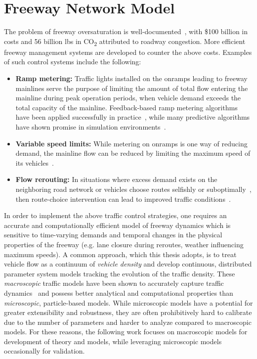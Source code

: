 \chapter{Freeway Network Model}
\label{chapter:freeway-network-model}

The problem of freeway oversaturation is well-documented~\cite{schrank2012tti}, with \$100 billion in costs and 56 billion lbs in CO\textsubscript{2} attributed to roadway congestion. More efficient freeway management systems are developed to counter the above costs. Examples of such control systems include the following:

\begin{itemize}
  	\item \textbf{Ramp metering: } Traffic lights installed on the onramps leading to freeway mainlines serve the purpose of limiting the amount of total flow entering the mainline during peak operation periods, when vehicle demand exceeds the total capacity of the mainline. Feedback-based ramp metering algorithms have been applied successfully in practice~\cite{papageorgiou1997alinea,Papageorgiou1991,Papamichail}, while many predictive algorithms have shown promise in simulation environments~\cite{Reilly2013b,gomes2006optimal,Kotsialos2004}.
  	\item \textbf{Variable speed limits: } While metering on onramps is one way of reducing demand, the mainline flow can be reduced by limiting the maximum speed of its vehicles~\cite{Muralidharana}.
  	\item \textbf{Flow rerouting: } In situations where excess demand exists on the neighboring road network or vehicles choose routes selfishly or suboptimally~\cite{krichenetac,jebbari2013stackelberg,Krichene2012a,Roughgarden2003}, then route-choice intervention can lead to improved traffic conditions~\cite{Samaranayake2014,ziliaskopoulos2000linear}.
\end{itemize}

In order to implement the above traffic control strategies, one requires an accurate and computationally efficient model of freeway dynamics which is sensitive to time-varying demands and temporal changes in the physical properties of the freeway (e.g. lane closure during reroutes, weather influencing maximum speeds).
A common approach, which this thesis adopts, is to treat vehicle flow as a continuum of \emph{vehicle density} and develop continuous, distributed parameter system models tracking the evolution of the traffic density. These \emph{macroscopic} traffic models have been shown to accurately capture traffic dynamics~\cite{papageorgiou1989macroscopic} and possess better analytical and computational properties than \emph{microscopic}, particle-based models. While microscopic models have a potential for greater extensibility and robustness, they are often prohibitively hard to calibrate due to the number of parameters and harder to analyze compared to macroscopic models. For these reasons, the following work focuses on macroscopic models for development of theory and models, while leveraging microscopic models occasionally for validation.

